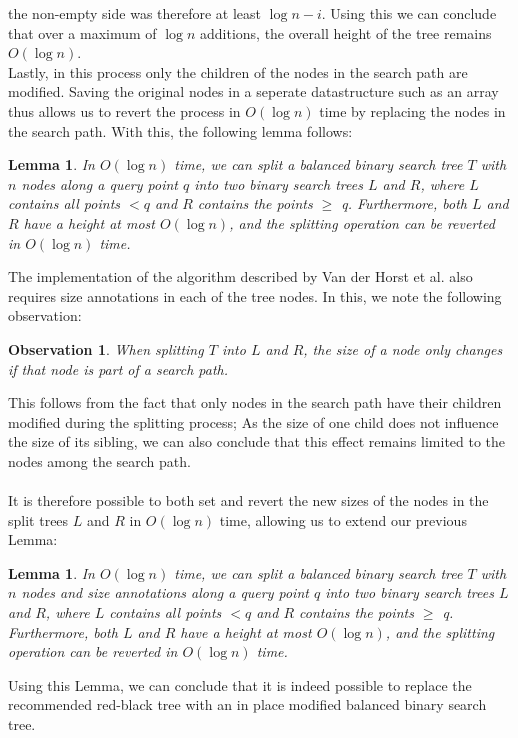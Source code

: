 \documentclass{article}
\newtheorem{lemma}[theorem]{Lemma}
\newtheorem{observation}{Observation}[theorem]
\begin{document}
the non-empty side was therefore at least $\log n - i$. Using this we can
conclude that over a maximum of $\log n$ additions, the overall height of the
tree remains $O(\log n)$.\\ Lastly, in this process only the children of the
nodes in the search path are modified. Saving the original nodes in a seperate
datastructure such as an array thus allows us to revert the process in $O(\log
    n)$ time by replacing the nodes in the search path. With this, the following
lemma follows: \\
\begin{lemma}
    In $O(\log n)$ time, we can split a balanced binary search tree $T$ with $n$ nodes along a query point $q$ into two binary search trees $L$ and $R$, where $L$ contains all points $<q$ and $R$ contains the points $\geq$ q. Furthermore, both $L$ and $R$ have a height at most $O(\log n)$, and the splitting operation can be reverted in $O(\log n)$ time.
\end{lemma}
The implementation of the algorithm described by Van der Horst et al. also requires size annotations in each of the tree nodes. In this, we note the following observation:
\begin{observation}
    When splitting $T$ into $L$ and $R$, the size of a node only changes if that node is part of a search path.
\end{observation}
This follows from the fact that only nodes in the search path have their children modified during the splitting process; As the size of one child does not influence the size of its sibling, we can also conclude that this effect remains limited to the nodes among the search path. \\\\
It is therefore possible to both set and revert the new sizes of the nodes in the split trees $L$ and $R$ in $O(\log n)$ time, allowing us to extend our previous Lemma:
\begin{lemma}
    In $O(\log n)$ time, we can split a balanced binary search tree $T$ with $n$ nodes and size annotations along a query point $q$ into two binary search trees $L$ and $R$, where $L$ contains all points $<q$ and $R$ contains the points $\geq$ q. Furthermore, both $L$ and $R$ have a height at most $O(\log n)$, and the splitting operation can be reverted in $O(\log n)$ time.
\end{lemma}
Using this Lemma, we can conclude that it is indeed possible to replace the recommended red-black tree with an in place modified balanced binary search tree.
\end{document}
